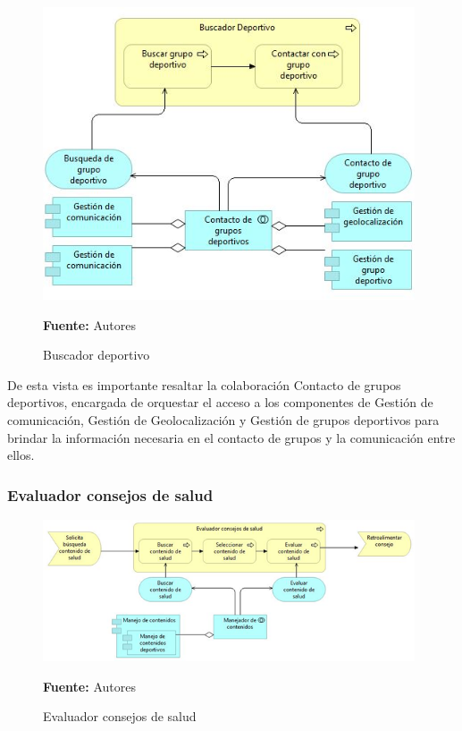 \begin{figure}[!htb]
  \begin{center}
    \includegraphics[width=11cm]{./imagenes/Archimate/vistas/application_usage/buscadordeportivo.png}
    \caption{Buscador deportivo}
    \label{fig:BP_BuscadorDeportivo}
    \textbf{Fuente:}  Autores
  \end{center}
\end{figure}

De esta vista es importante resaltar la colaboración Contacto de grupos deportivos, encargada de orquestar el acceso a los componentes de Gestión de comunicación, Gestión de Geolocalización y Gestión de grupos deportivos para brindar la información necesaria en el contacto de grupos y la comunicación entre ellos.

\subsubsection{Evaluador consejos de salud}

\begin{figure}[!htb]
  \begin{center}
    \includegraphics[width=11cm]{./imagenes/Archimate/vistas/application_usage/evaluadorconsejossalud.png}
    \caption{Evaluador consejos de salud}
    \label{fig:BP_EvaluadorConsejosSalud}
    \textbf{Fuente:}  Autores
  \end{center}
\end{figure}

